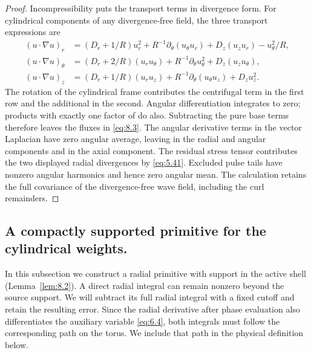 \begin{proof}
Incompressibility puts the transport terms in divergence form. For cylindrical components of any divergence-free field, the three transport expressions are
\begin{align*}
  (u\cdot\nabla u)_r
    &=(D_r+1/R)u_r^2+R^{-1}\partial_\theta(u_\theta u_r)+D_z(u_z u_r)-u_\theta^2/R,\\
  (u\cdot\nabla u)_\theta
    &=(D_r+2/R)(u_r u_\theta)+R^{-1}\partial_\theta u_\theta^2+D_z(u_z u_\theta),\\
  (u\cdot\nabla u)_z
    &=(D_r+1/R)(u_r u_z)+R^{-1}\partial_\theta(u_\theta u_z)+D_z u_z^2.
\end{align*}
The rotation of the cylindrical frame contributes the centrifugal term in the first row and the
additional  in the second. Angular differentiation integrates to zero; products with
exactly one factor of  do also. Subtracting the pure base terms therefore leaves the fluxes in
\eqref{eq:8.3}. The angular derivative terms in the vector Laplacian have zero angular average, leaving
 in the radial and angular components and
 in the axial component. The residual
stress tensor contributes the two displayed radial divergences by \eqref{eq:5.41}. Excluded pulse tails
have nonzero angular harmonics and hence zero angular mean. The calculation retains the
full covariance of the divergence-free wave field, including the curl remainders.
\end{proof}

\subsection{A compactly supported primitive for the cylindrical weights.}\label{sec:8.2}
In this subsection we
construct a radial primitive with support in the active shell (Lemma~\ref{lem:8.2}). A direct radial
integral can remain nonzero beyond the source support. We will subtract its full radial
integral with a fixed cutoff and retain the resulting error. Since the radial derivative after
phase evaluation also differentiates the auxiliary variable \eqref{eq:6.4}, both integrals must follow
the corresponding path on the torus. We include that path in the physical definition below.

